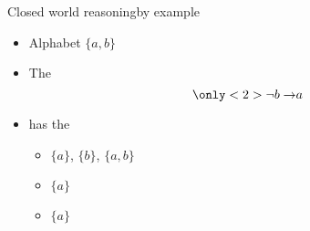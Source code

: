 \begin{frame}{Closed world reasoning}{by example}
  \bigskip
  \begin{itemize}
  \item Alphabet $\{a,b\}$
    \medskip
  \item The 
    \[
      \only<2>{\neg b\to} a
    \]
  \item[] has the
    \par\smallskip
    \begin{itemize}\normalsize
    \item {}         $\{a\}$, $\{b\}$, $\{a,b\}$
      \smallskip
    \item {} $\{a\}$
      \smallskip
    \item {}  $\{a\}$
    \end{itemize}
  \end{itemize}
\end{frame}
%
